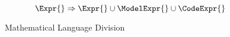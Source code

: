 
\begin{figure}[H]
    \centering
    \caption{Mathematical Language Division}
    \label{fig:mathLanguageDivision}

    \[\Expr{} \Rightarrow{} \Expr{} \cup{} \ModelExpr{} \cup{} \CodeExpr{}\]
\end{figure}
